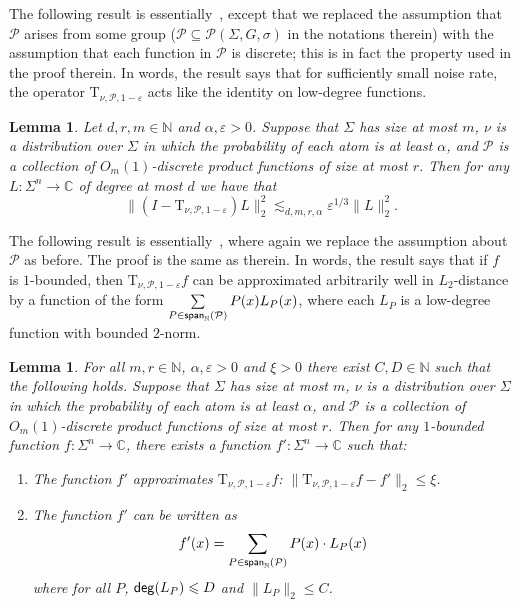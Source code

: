 \documentclass[10pt,a4paper]{amsart}
\newtheorem{lemma}[thm]{Lemma}
\newcommand\norm[1]{\| #1 \|}
\renewcommand{\lll}{\lesssim}
\newcommand\spn{{\sf span}_{\mathbb{N}}}
\newcommand\eps{\varepsilon}
\renewcommand\leq{\leqslant}
\begin{document}
The following result is essentially~\cite[Claim 4.5]{BKM5}, except that we replaced the assumption that $\mathcal{P}$ arises from some group ($\mathcal{P}\subseteq\mathcal{P}(\Sigma,G,\sigma)$ in the notations therein) with the assumption that each function in $\mathcal{P}$ is discrete; this is in fact the property used in the proof therein. In words, the result says that for sufficiently small noise rate, the operator $\mathrm{T}_{\nu,\mathcal{P},1-\eps}$ acts like the identity on low-degree functions.
\begin{lemma}\label{lem:act_on_ld}
		Let $d,r,m\in\mathbb{N}$ and $\alpha,\eps>0$.
		Suppose that $\Sigma$ has size at most $m$, $\nu$ is a distribution over $\Sigma$
		in which the probability of each atom is at least $\alpha$, and
		$\mathcal{P}$
		is a collection of $O_m(1)$-discrete product functions of size at most $r$. Then for any $L\colon \Sigma^n\to\mathbb{C}$ of degree at most $d$
		we have that
		\[
		\norm{(I-\mathrm{T}_{\nu,\mathcal{P}, 1-\eps})L}_2^2\lll_{d,m,r,\alpha} \eps^{1/3}\norm{L}_2^2.
		\]
	\end{lemma}
The following result is essentially~\cite[Lemma 4.9]{BKM5}, where again we replace the assumption about $\mathcal{P}$ as before. The proof is the same as therein. In words, the result says that if $f$ is $1$-bounded, then $\mathrm{T}_{\nu,\mathcal{P}, 1-\eps}f$ can be approximated arbitrarily well in $L_2$-distance by a function of the form 
$\sum\limits_{P\in \spn(\mathcal{P})} P(x)L_P(x)$, where each $L_P$ is a low-degree function with bounded $2$-norm.
\begin{lemma}\label{lem:approx_formula}
		For all $m,r\in\mathbb{N}$, $\alpha, \eps>0$ and $\xi>0$ there exist $C, D\in\mathbb{N}$ such that the following holds.
		Suppose that $\Sigma$ has size at most $m$, $\nu$ is a distribution over $\Sigma$
		in which the probability of each atom is at least $\alpha$, and
		$\mathcal{P}$ is a collection of $O_m(1)$-discrete product functions of size at most $r$.
		Then for any $1$-bounded function $f\colon \Sigma^n\to\mathbb{C}$, there exists a function
		$f'\colon\Sigma^n\to\mathbb{C}$ such that:
		\begin{enumerate}
			\item The function $f'$ approximates $\mathrm{T}_{\nu,\mathcal{P}, 1-\eps}f$: $\norm{\mathrm{T}_{\nu,\mathcal{P}, 1-\eps}f - f'}_2\leq \xi$.
			\item The function $f'$ can be written as
			\[
			f'(x) = \sum\limits_{P\in \spn(\mathcal{P})}P(x)\cdot L_{P}(x)
			\]
			where for all $P$, ${\sf deg}(L_P)\leq D$ and $\norm{L_P}_2\leq C$.
		\end{enumerate}
	\end{lemma}
\end{document}
